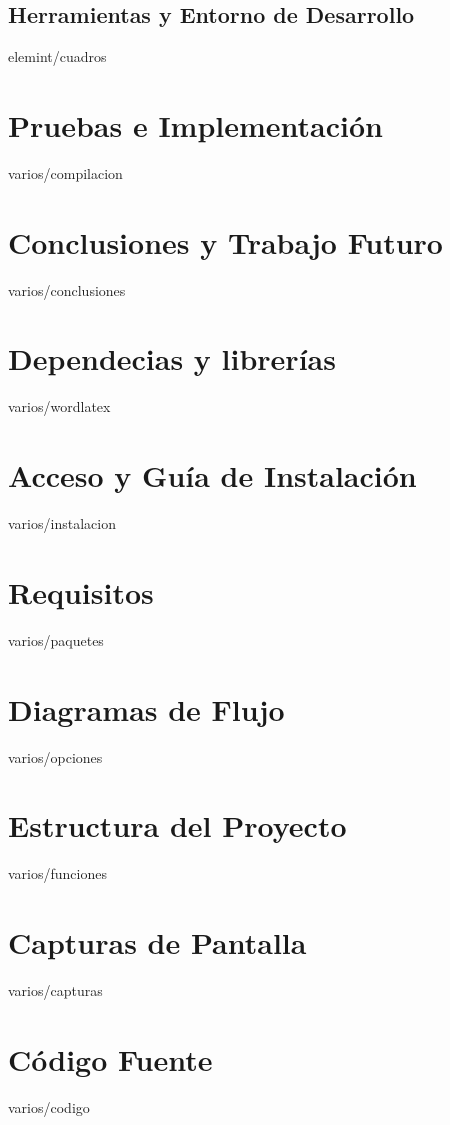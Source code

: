 \documentclass[epsbased,copyright,final,printable,covers,extendedindex,firstnumbered,tfg,gnuplot]{tfgtfmthesisuam}
\begin{document}
  \section{Herramientas y Entorno de Desarrollo\label{SEC:CUADROS}}{elemint/cuadros}

\chapter{Pruebas e Implementación\label{CAP:COMPILACION}}{varios/compilacion}

\chapter{Conclusiones y Trabajo Futuro\label{CAP:CONCLUSIONES}}{varios/conclusiones}

\appendix

\chapter{Dependecias y librerías\label{CAP:WORDLATEX}}{varios/wordlatex}
\chapter{Acceso y Guía de Instalación\label{CAP:INSTALACION}}{varios/instalacion}
\chapter{Requisitos\label{CAP:PAQUETES}}{varios/paquetes}
\chapter{Diagramas de Flujo\label{CAP:OPCIONES}}{varios/opciones}
\chapter{Estructura del Proyecto\label{CAP:FUNCENT}}{varios/funciones}
\chapter{Capturas de Pantalla\label{CAP:CAPTURAS}}{varios/capturas}
\chapter{Código Fuente\label{CAP:CODIGO}}{varios/codigo}
\end{document}

